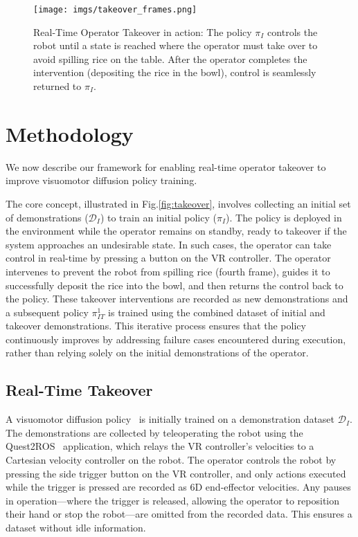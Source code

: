 

\begin{figure*}[ht] \centering \texttt{[image: imgs/takeover\_frames.png]} \caption{Real-Time Operator Takeover in action: The policy $\pi_I$ controls the robot until a state is reached where the operator must take over to avoid spilling rice on the table. After the operator completes the intervention (depositing the rice in the bowl), control is seamlessly returned to $\pi_I$.} \label{fig:takeover_frames} \end{figure*}

\section{Methodology} \label{sec
}

We now describe our framework for enabling real-time operator takeover to improve visuomotor diffusion policy training.

The core concept, illustrated in Fig.\ref{fig:takeover}, involves collecting an initial set of demonstrations ($\mathcal{D}_I$) to train an initial policy ($\pi_I$). The policy is deployed in the environment while the operator remains on standby, ready to takeover if the system approaches an undesirable state. In such cases, the operator can take control in real-time by pressing a button on the VR controller. The operator intervenes to prevent the robot from spilling rice (fourth frame), guides it to successfully deposit the rice into the bowl, and then returns the control back to the policy. These takeover interventions are recorded as new demonstrations and a subsequent policy $\pi_{IT}^1$ is trained using the combined dataset of initial and takeover demonstrations. This iterative process ensures that the policy continuously improves by addressing failure cases encountered during execution, rather than relying solely on the initial demonstrations of the operator.

\subsection{Real-Time Takeover} A visuomotor diffusion policy~\cite{chi2023diffusion} is initially trained on a demonstration dataset $\mathcal{D}_I$. The demonstrations are collected by teleoperating the robot using the Quest2ROS~\cite{welle2024quest2ros} application, which relays the VR controller’s velocities to a Cartesian velocity controller on the robot. The operator controls the robot by pressing the side trigger button on the VR controller, and only actions executed while the trigger is pressed are recorded as $6$D end-effector velocities. Any pauses in operation—where the trigger is released, allowing the operator to reposition their hand or stop the robot—are omitted from the recorded data. This ensures a dataset without idle information.

